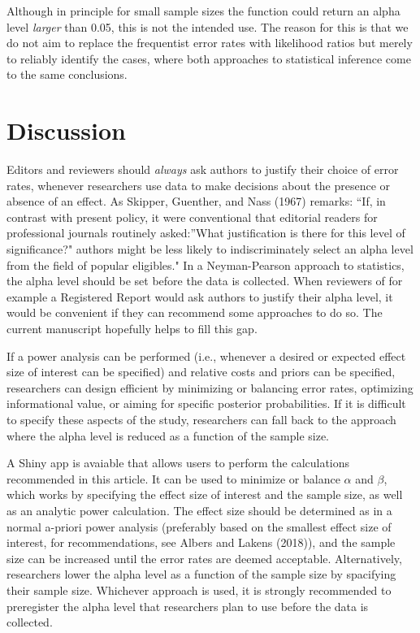 \documentclass[
  english,
  ,jou,floatsintext]{apa6}
\begin{document}
Although in principle for small sample sizes the function could return an alpha level \emph{larger} than 0.05, this is not the intended use. The reason for this is that we do not aim to replace the frequentist error rates with likelihood ratios but merely to reliably identify the cases, where both approaches to statistical inference come to the same conclusions.

\hypertarget{discussion}{%
\section{Discussion}\label{discussion}}

Editors and reviewers should \emph{always} ask authors to justify their choice of error rates, whenever researchers use data to make decisions about the presence or absence of an effect. As Skipper, Guenther, and Nass (1967) remarks: ``If, in contrast with present policy, it were conventional that editorial readers for professional journals routinely asked:''What justification is there for this level of significance?" authors might be less likely to indiscriminately select an alpha level from the field of popular eligibles." In a Neyman-Pearson approach to statistics, the alpha level should be set before the data is collected. When reviewers of for example a Registered Report would ask authors to justify their alpha level, it would be convenient if they can recommend some approaches to do so. The current manuscript hopefully helps to fill this gap.

If a power analysis can be performed (i.e., whenever a desired or expected effect size of interest can be specified) and relative costs and priors can be specified, researchers can design efficient by minimizing or balancing error rates, optimizing informational value, or aiming for specific posterior probabilities. If it is difficult to specify these aspects of the study, researchers can fall back to the approach where the alpha level is reduced as a function of the sample size.

A Shiny app is avaiable that allows users to perform the calculations recommended in this article. It can be used to minimize or balance \(\alpha\) and \(\beta\), which works by specifying the effect size of interest and the sample size, as well as an analytic power calculation. The effect size should be determined as in a normal a-priori power analysis (preferably based on the smallest effect size of interest, for recommendations, see Albers and Lakens (2018)), and the sample size can be increased until the error rates are deemed acceptable. Alternatively, researchers lower the alpha level as a function of the sample size by spacifying their sample size. Whichever approach is used, it is strongly recommended to preregister the alpha level that researchers plan to use before the data is collected.
\end{document}
